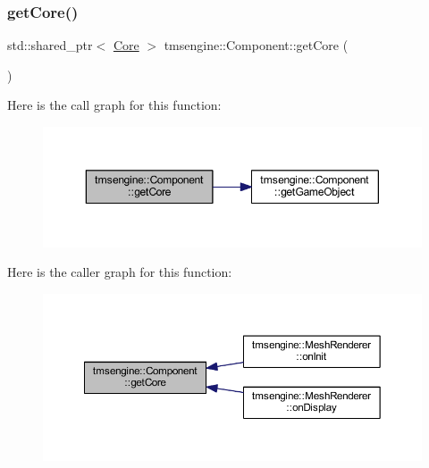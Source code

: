 \subsubsection{\texorpdfstring{get\+Core()}{getCore()}}
{\footnotesize\ttfamily std\+::shared\+\_\+ptr$<$ \hyperlink{classtmsengine_1_1_core}{Core} $>$ tmsengine\+::\+Component\+::get\+Core (\begin{DoxyParamCaption}{ }\end{DoxyParamCaption})}

Here is the call graph for this function\+:\nopagebreak
\begin{figure}[H]
\begin{center}
\leavevmode
\includegraphics[width=350pt]{classtmsengine_1_1_component_a80494876282c5e19caeffe6c06c8d4bb_cgraph}
\end{center}
\end{figure}
Here is the caller graph for this function\+:\nopagebreak
\begin{figure}[H]
\begin{center}
\leavevmode
\includegraphics[width=350pt]{classtmsengine_1_1_component_a80494876282c5e19caeffe6c06c8d4bb_icgraph}
\end{center}
\end{figure}
\mbox{\label{classtmsengine_1_1_component_a3df74e0c90f7519e3a9ab541dc77068a}} 
